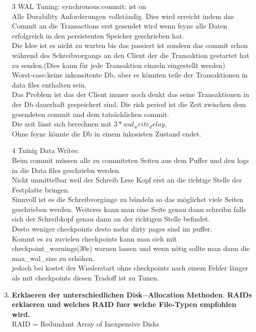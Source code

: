 \documentclass[12pt]{article}\pagestyle{myheadings}
\theoremstyle{plain}
\begin{document}
\begin{enumerate}
\item[3]WAL Tuning: synchronous:commit: ist on\\
Alle Durability Anforderungen vollständig.
Dies wird erreicht indem das Commit an die Transactions erst gesendet wird wenn fsync alle Daten erfolgreich in den persistenten Speicher geschrieben hat.\\
Die Idee ist es nicht zu warten bis das passiert ist sondern das commit schon während des Schreibvorgangs an den Client der die Transaktion gestartet hat zu senden.(Dies kann für jede Transaktion einzeln eingestellt werden)\\
Worst-case:keine inkonsitente Db, aber es könnten teile der Transaktionen in data files enthalten sein.\\Das Problem ist das der Client immer noch denkt das seine Transaktionen in der Db dauerhaft gespeichert sind.
Die risk period ist die Zeit zwischen dem gesendeten commit und dem tatsächlichen commit.\\
Die zeit lässt sich berechnen mit $3* wal_write_delay$.\\
Ohne fsync könnte die Db in einem inkosisten Zustand endet.\\
\item[4] Tuinig Data Writes: \\
Beim commit müssen alle zu commiteten Seiten aus dem Puffer und den logs in die Data files geschriebn werden.\\
Nicht unmittelbar weil der Schreib Lese Kopf erst an die richtige Stelle der Festplatte bringen.\\
Sinnvoll ist es die Schreibvorgänge zu bündeln so das möglichst viele Seiten geschrieben werden. Weiteres kann man eine Seite genau dann schreibn falls sich der Schreibkopf genau dann an der richtigen Stelle befindet.\\
Desto weniger checkpoints desto mehr dirty pages sind im puffer.\\
Kommt es zu zuvielen checkpoints kann man sich mit checkpoint\_warnings(30s) warnen lassen und wenn nötig sollte man dann die max\_wal\_size zu erhöhen.\\
jedoch bei kostet der Wiederstart ohne checkpoints nach einem Fehler länger als mit checkpoints diesen Tradoff ist zu Tunen.
\item \textbf{Erklaeren der unterschiedlichen Disk$-$Allocation Methoden$.$ RAIDs erklaeren und welches RAID fuer welche
File-Typen empfohlen wird.} \\
RAID = Redundant Array of Inexpensive Disks\\

\end{enumerate}
\end{document}
